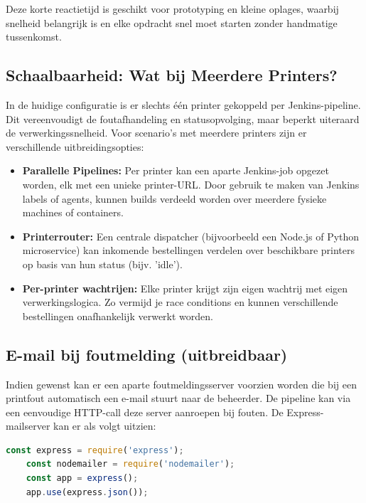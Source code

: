 \begin{enumerate}
Deze korte reactietijd is geschikt voor prototyping en kleine oplages, waarbij snelheid belangrijk is en elke opdracht snel moet starten zonder handmatige tussenkomst.

\subsection{Schaalbaarheid: Wat bij Meerdere Printers?}

In de huidige configuratie is er slechts één printer gekoppeld per Jenkins-pipeline. Dit vereenvoudigt de foutafhandeling en statusopvolging, maar beperkt uiteraard de verwerkingssnelheid. Voor scenario’s met meerdere printers zijn er verschillende uitbreidingsopties:

\begin{itemize}
    \item \textbf{Parallelle Pipelines:} Per printer kan een aparte Jenkins-job opgezet worden, elk met een unieke printer-URL. Door gebruik te maken van Jenkins labels of agents, kunnen builds verdeeld worden over meerdere fysieke machines of containers.
    
    \item \textbf{Printerrouter:} Een centrale dispatcher (bijvoorbeeld een Node.js of Python microservice) kan inkomende bestellingen verdelen over beschikbare printers op basis van hun status (bijv. 'idle').
    
    \item \textbf{Per-printer wachtrijen:} Elke printer krijgt zijn eigen wachtrij met eigen verwerkingslogica. Zo vermijd je race conditions en kunnen verschillende bestellingen onafhankelijk verwerkt worden.
\end{itemize}


\subsection{E-mail bij foutmelding (uitbreidbaar)}
Indien gewenst kan er een aparte foutmeldingsserver voorzien worden die bij een printfout automatisch een e-mail stuurt naar de beheerder. De pipeline kan via een eenvoudige HTTP-call deze server aanroepen bij fouten. De Express-mailserver kan er als volgt uitzien:

\begin{lstlisting}[language=javascript, caption=Express-server voor foutnotificatie per e-mail]
    const express = require('express');
    const nodemailer = require('nodemailer');
    const app = express();
    app.use(express.json());
    

\end{lstlisting}
\end{enumerate}

